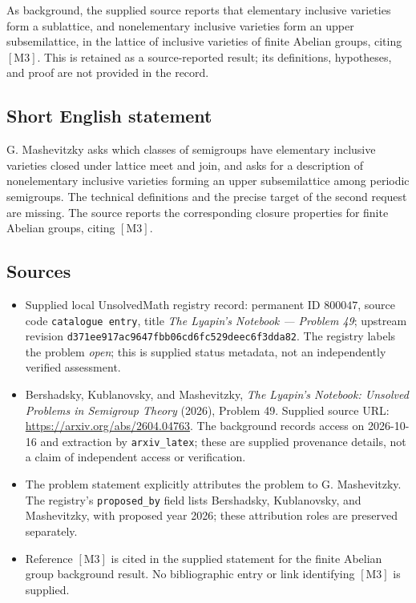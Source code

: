 \documentclass[11pt]{article}
\begin{document}
As background, the supplied source reports that elementary inclusive varieties form a sublattice, and nonelementary inclusive varieties form an upper subsemilattice, in the lattice of inclusive varieties of finite Abelian groups, citing \([\mathrm{M3}]\). This is retained as a source-reported result; its definitions, hypotheses, and proof are not provided in the record.
\subsection{Short English statement}
G. Mashevitzky asks which classes of semigroups have elementary inclusive varieties closed under lattice meet and join, and asks for a description of nonelementary inclusive varieties forming an upper subsemilattice among periodic semigroups. The technical definitions and the precise target of the second request are missing. The source reports the corresponding closure properties for finite Abelian groups, citing \([\mathrm{M3}]\).
\subsection{Sources}
\begin{itemize}
\item Supplied local UnsolvedMath registry record: permanent ID \(800047\), source code \texttt{catalogue entry}, title \emph{The Lyapin's Notebook --- Problem 49}; upstream revision \texttt{d371ee917ac9647fbb06cd6fc529deec6f3dda82}. The registry labels the problem \emph{open}; this is supplied status metadata, not an independently verified assessment.
\item Bershadsky, Kublanovsky, and Mashevitzky, \emph{The Lyapin's Notebook: Unsolved Problems in Semigroup Theory} (2026), Problem 49. Supplied source URL: \url{https://arxiv.org/abs/2604.04763}. The background records access on 2026-10-16 and extraction by \texttt{arxiv\_latex}; these are supplied provenance details, not a claim of independent access or verification.
\item The problem statement explicitly attributes the problem to G. Mashevitzky. The registry's \texttt{proposed\_by} field lists Bershadsky, Kublanovsky, and Mashevitzky, with proposed year 2026; these attribution roles are preserved separately.
\item Reference \([\mathrm{M3}]\) is cited in the supplied statement for the finite Abelian group background result. No bibliographic entry or link identifying \([\mathrm{M3}]\) is supplied.
\end{itemize}
\end{document}
